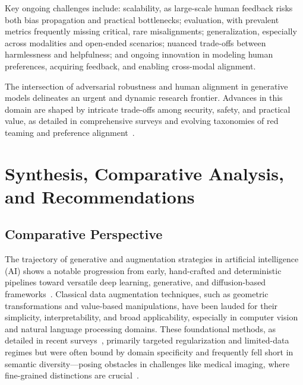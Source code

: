 \documentclass[sigconf]{acmart}
\begin{document}
Key ongoing challenges include: scalability, as large-scale human feedback risks both bias propagation and practical bottlenecks; evaluation, with prevalent metrics frequently missing critical, rare misalignments; generalization, especially across modalities and open-ended scenarios; nuanced trade-offs between harmlessness and helpfulness; and ongoing innovation in modeling human preferences, acquiring feedback, and enabling cross-modal alignment.

The intersection of adversarial robustness and human alignment in generative models delineates an urgent and dynamic research frontier. Advances in this domain are shaped by intricate trade-offs among security, safety, and practical value, as detailed in comprehensive surveys and evolving taxonomies of red teaming and preference alignment~\cite{ref67,ref69,ref75,ref85}.

\section{Synthesis, Comparative Analysis, and Recommendations}

\subsection{Comparative Perspective}

The trajectory of generative and augmentation strategies in artificial intelligence (AI) shows a notable progression from early, hand-crafted and deterministic pipelines toward versatile deep learning, generative, and diffusion-based frameworks~\cite{ref61,ref62,ref64,ref65,ref75,ref81,ref82,ref87,ref90,ref101,ref102}. Classical data augmentation techniques, such as geometric transformations and value-based manipulations, have been lauded for their simplicity, interpretability, and broad applicability, especially in computer vision and natural language processing domains. These foundational methods, as detailed in recent surveys~\cite{ref61,ref62,ref64,ref65}, primarily targeted regularization and limited-data regimes but were often bound by domain specificity and frequently fell short in semantic diversity—posing obstacles in challenges like medical imaging, where fine-grained distinctions are crucial~\cite{ref61,ref62,ref102}.
\end{document}
